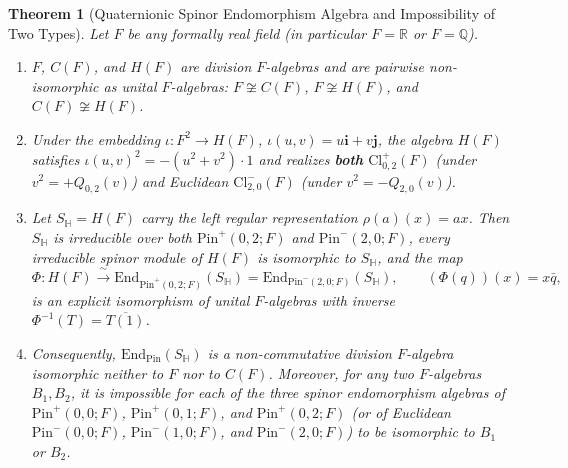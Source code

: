 \documentclass[11pt,a4paper]{article}
\theoremstyle{plain}
\newtheorem{theorem}{Theorem}[section]
\theoremstyle{definition}
\newcommand{\Cl}{\mathrm{Cl}}
\newcommand{\Pin}{\mathrm{Pin}}
\newcommand{\End}{\mathrm{End}}
\newcommand{\R}{\mathbb{R}}
\newcommand{\HH}{\mathbb{H}}
\newcommand{\Q}{\mathbb{Q}}
\begin{document}
\begin{theorem}[Quaternionic Spinor Endomorphism Algebra and Impossibility of Two Types]
\label{thm:quat-refutation}
Let $F$ be any formally real field (in particular $F = \R$ or $F = \Q$).
\begin{enumerate}
\item[(i)] $F$, $C(F)$, and $H(F)$ are division $F$-algebras and are pairwise non-isomorphic as unital $F$-algebras: $F \not\cong C(F)$, $F \not\cong H(F)$, and $C(F) \not\cong H(F)$.
\item[(ii)] Under the embedding $\iota : F^2 \to H(F)$, $\iota(u,v) = u\mathbf{i} + v\mathbf{j}$, the algebra $H(F)$ satisfies $\iota(u,v)^2 = -(u^2 + v^2)\cdot 1$ and realizes \textbf{both} $\Cl_{0,2}^+(F)$ (under $v^2 = +Q_{0,2}(v)$) and Euclidean $\Cl_{2,0}^-(F)$ (under $v^2 = -Q_{2,0}(v)$).
\item[(iii)] Let $S_{\HH} = H(F)$ carry the left regular representation $\rho(a)(x) = a x$. Then $S_{\HH}$ is irreducible over both $\Pin^+(0,2; F)$ and $\Pin^-(2,0; F)$, every irreducible spinor module of $H(F)$ is isomorphic to $S_{\HH}$, and the map
\[
  \Phi : H(F) \xrightarrow{\;\sim\;} \End_{\Pin^+(0,2; F)}(S_{\HH}) = \End_{\Pin^-(2,0; F)}(S_{\HH}), \qquad (\Phi(q))(x) = x \bar{q},
\]
is an explicit isomorphism of unital $F$-algebras with inverse $\Phi^{-1}(T) = \overline{T(1)}$.
\item[(iv)] Consequently, $\End_{\Pin}(S_{\HH})$ is a non-commutative division $F$-algebra isomorphic neither to $F$ nor to $C(F)$. Moreover, for \emph{any} two $F$-algebras $B_1, B_2$, it is impossible for each of the three spinor endomorphism algebras of $\Pin^+(0,0;F)$, $\Pin^+(0,1;F)$, and $\Pin^+(0,2;F)$ (or of Euclidean $\Pin^-(0,0;F)$, $\Pin^-(1,0;F)$, and $\Pin^-(2,0;F)$) to be isomorphic to $B_1$ or $B_2$.
\end{enumerate}
\end{theorem}
\end{document}
